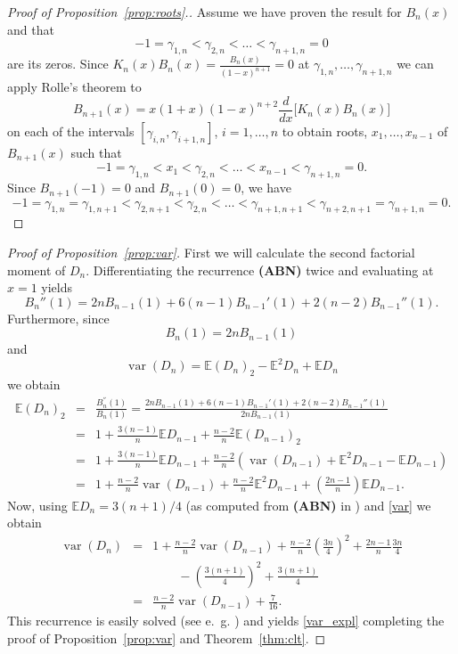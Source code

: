 \documentclass[10pt]{amsart}
\numberwithin{subcase}{case}
\begin{document}
\begin{proof}[Proof of Proposition~\ref{prop:roots}.]
Assume we have proven the result for $B_n(x)$ and that 
 \[-1=\gamma_{1,n}<\gamma_{2,n}<\dots<\gamma_{n+1,n}=0\] are its zeros.  Since $K_n(x)B_n(x)=\frac{B_n(x)}{(1-x)^{n+1}}=0$ at $\gamma_{1,n},\dots,\gamma_{n+1,n}$
we can apply Rolle's theorem to 
\[B_{n+1}(x)=x(1+x)(1-x)^{n+2}\frac{d}{dx}\Big[K_{n}(x)B_{n}(x)\Big]
\]
on each of the intervals $[\gamma_{i,n},\gamma_{i+1,n}]$, $i=1,\dots, n$
 to obtain roots, $x_1,\dots,x_{n-1}$ of $B_{n+1}(x)$ such that 
\[
-1=\gamma_{1,n}<x_1<\gamma_{2,n}<\dots<x_{n-1}<\gamma_{n+1,n}=0.
\]
Since $B_{n+1}(-1)=0$ and $B_{n+1}(0)=0$, we have
\[
-1=\gamma_{1,n}=\gamma_{1,n+1}<\gamma_{2,n+1}<\gamma_{2,n}<\dots<\gamma_{n+1,n+1}<\gamma_{n+2,n+1}=\gamma_{n+1,n}=0.
\]
\end{proof}

\begin{proof}[Proof of Proposition~\ref{prop:var}]
First we will calculate the second factorial moment of $D_{n}$. 
Differentiating the recurrence {\bf(ABN)} twice and evaluating at $x=1$ yields
\[B_n''(1)=2nB_{n-1}(1)+6(n-1)B_{n-1}'(1)+2(n-2)B_{n-1}''(1).\]
Furthermore, since
\[B_n(1)=2nB_{n-1}(1)\]
and 
\begin{equation}\label{var}{\operatorname{var}}(D_{n})={\mathbb{E}}(D_{n})_2-{\mathbb{E}}^2D_{n}+{\mathbb{E}} D_{n}
\end{equation}
we obtain
\begin{eqnarray*}
{\mathbb{E}}(D_{n})_2&=&\frac{B^{''}_{n}(1)}{B_{n}(1)}
=\frac{2nB_{n-1}(1)+6(n-1)B_{n-1}'(1)+2(n-2)B_{n-1}''(1)}
{2nB_{n-1}(1)}\\
&=&1+\frac{3(n-1)}{n}{\mathbb{E}} D_{n-1}+\frac{n-2}{n}{\mathbb{E}}(D_{n-1})_2
\\
&=&1+\frac{3(n-1)}{n}{\mathbb{E}} D_{n-1}+\frac{n-2}{n}\left({\operatorname{var}}(D_{n-1})+{\mathbb{E}}^2D_{n-1}-{\mathbb{E}} D_{n-1}\right)
\\
&=&1+\frac{n-2}{n}{\operatorname{var}}(D_{n-1})+\frac{n-2}{n}{\mathbb{E}}^2D_{n-1}+\left(\frac{2n-1}{n}\right){\mathbb{E}} D_{n-1}.
\end{eqnarray*}
Now, using ${\mathbb{E}} D_{n}=3(n+1)/4$ (as computed from {\bf(ABN)} in \cite[Proposition~19]{ABN}) and \eqref{var} we obtain
\begin{eqnarray*}
{\operatorname{var}}(D_{n})&=&1+\frac{n-2}{n}{\operatorname{var}}(D_{n-1})+\frac{n-2}{n}\left(\frac{3n}4\right)^2+\frac{2n-1}{n}\frac{3n}4\\&&\qquad-\left(\frac{3(n+1)}{4}\right)^2+\frac{3(n+1)}{4}\\
&=&\frac{n-2}{n}{\operatorname{var}}(D_{n-1})+\frac{7}{16}.
\end{eqnarray*}
This recurrence is easily solved (see e.~g. \cite[Section~2.2]{GKP}) and yields \eqref{var_expl} completing the proof of Proposition~\ref{prop:var} and Theorem~\ref{thm:clt}.
\end{proof}
\end{document}
